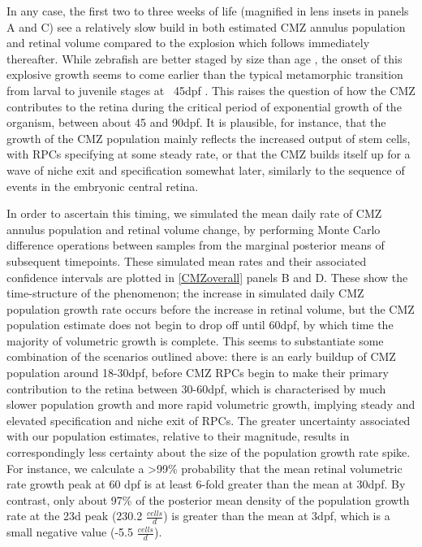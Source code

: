 In any case, the first two to three weeks of life (magnified in lens insets in panels A and C) see a relatively slow build in both estimated CMZ annulus population and retinal volume compared to the explosion which follows immediately thereafter. While zebrafish are better staged by size than age \cite{Parichy2009}, the onset of this explosive growth seems to come earlier than the typical metamorphic transition from larval to juvenile stages at ~45dpf \cite{Singleman2014}. This raises the question of how the CMZ contributes to the retina during the critical period of exponential growth of the organism, between about 45 and 90dpf. It is plausible, for instance, that the growth of the CMZ population mainly reflects the increased output of stem cells, with RPCs specifying at some steady rate, or that the CMZ builds itself up for a wave of niche exit and specification somewhat later, similarly to the sequence of events in the embryonic central retina.

In order to ascertain this timing, we simulated the mean daily rate of CMZ annulus population and retinal volume change, by performing Monte Carlo difference operations between samples from the marginal posterior means of subsequent timepoints. These simulated mean rates and their associated confidence intervals are plotted in \autoref{CMZoverall} panels B and D. These show the time-structure of the phenomenon; the increase in simulated daily CMZ population growth rate occurs before the increase in retinal volume, but the CMZ population estimate does not begin to drop off until 60dpf, by which time the majority of volumetric growth is complete. This seems to substantiate some combination of the scenarios outlined above: there is an early buildup of CMZ population around 18-30dpf, before CMZ RPCs begin to make their primary contribution to the retina between 30-60dpf, which is characterised by much slower population growth and more rapid volumetric growth, implying steady and elevated specification and niche exit of RPCs. The greater uncertainty associated with our population estimates, relative to their magnitude, results in correspondingly less certainty about the size of the population growth rate spike. For instance, we calculate a >99\% probability that the mean retinal volumetric rate growth peak at 60 dpf is at least 6-fold greater than the mean at 30dpf. By contrast, only about 97\% of the posterior mean density of the population growth rate at the 23d peak (230.2 $\frac{cells}{d}$) is greater than the mean at 3dpf, which is a small negative value (-5.5 $\frac{cells}{d}$). 

